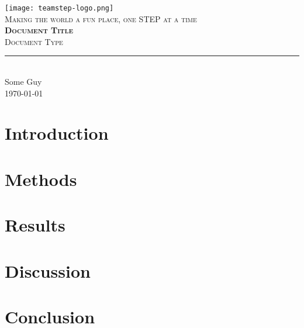 \documentclass[11pt,titlepage]{report}
\newcommand{\rtitle}{Document Title}
\newcommand{\rauthor}{Some Guy}
\newcommand{\rcategory}{Document Type}
\begin{document}
\begin{titlepage}
	\centering
    \texttt{[image: teamstep-logo.png]}\\[0.25cm] 	%
    \textsc{\LARGE Making the world a fun place, one STEP at a time}\\ \vspace{\fill}
    \textbf{\textsc{\fontsize{50}{50}\selectfont \rtitle}}\\ \vspace{\fill}		
	\textsc{\LARGE \rcategory}\\[0.4cm]
	\rule{\linewidth}{0.2 mm} \\[0.5 cm]
	\rauthor \\[2cm] \today
\end{titlepage}
\restoregeometry

\thispagestyle{numberonly}



\tableofcontents

\chapter{Introduction}


\chapter{Methods}


\chapter{Results}


\chapter{Discussion}


\chapter{Conclusion}


\clearpage
\pagestyle{numberonly}
\printbibliography[heading=bibintoc]
\end{document}
